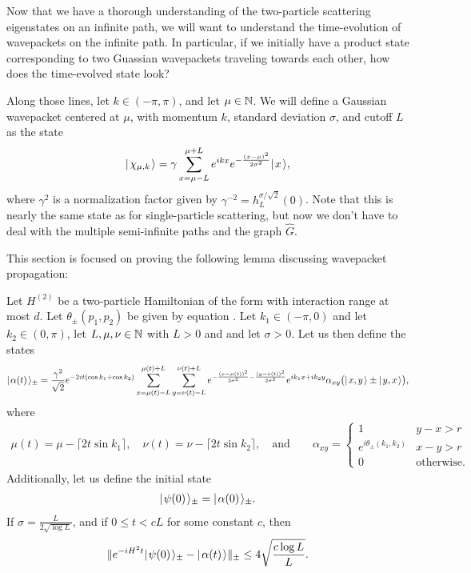 \documentclass[../thesis-main/thesis-main]{subfiles}
\begin{document}
Now that we have a thorough understanding of the two-particle scattering eigenstates on an infinite path, we will want to understand the time-evolution of wavepackets on the infinite path.  In particular, if we initially have a product state corresponding to two Guassian wavepackets traveling towards each other, how does the time-evolved state look?

Along those lines, let $k\in(-\pi,\pi)$, and let $\mu \in \mathbb{N}$.  We will define a Gaussian wavepacket centered at $\mu$, with momentum $k$, standard deviation $\sigma$, and cutoff $L$ as the state
\begin{align}
  |\mspace{2mu} \chi_{\mu,k} \mspace{2mu} \rangle = \gamma \sum_{x=\mu-L}^{\mu+L} e^{i k x} e^{ -\frac{(x-\mu)^2}{2\sigma^2}} |\mspace{2mu} x \mspace{2mu} \rangle,
\end{align}
where $\gamma^2$ is a normalization factor given by $\gamma^{-2} = h_L^{\sigma/\sqrt{2}}(0)$.  Note that this is nearly the same state as for single-particle scattering, but now we don't have to deal with the multiple semi-infinite paths and the graph $\widehat{G}$.

This section is focused on proving the following lemma discussing wavepacket propagation:
\begin{theorem}
Let $H^{(2)}$ be a two-particle Hamiltonian of the form  with interaction range at most $d$.  Let $\theta_{\pm}(p_1,p_2)$ be given by equation .  Let $k_1\in (-\pi,0)$ and let $k_2 \in (0,\pi)$, let $L,\mu, \nu \in \mathbb{N}$ with $L>0$ and and let $\sigma > 0$.  Let us then define the states
\begin{align}
  |\mspace{2mu} \alpha(t) \mspace{2mu} \rangle_{\pm} = \frac{\gamma^2}{\sqrt{2}} e^{-2i t (\cos k_1 + \cos k_2)} \sum_{x = \mu(t)-L}^{\mu(t)+L} \sum_{y = \nu(t) -L}^{\nu(t)+L} e^{ -\frac{ (x-\mu(t))^2}{2\sigma^2} - \frac{(y-\nu(t))^2}{2\sigma^2}} e^{i k_1 x + i k_2 y} \alpha_{xy} \big( |\mspace{2mu} x,y \mspace{2mu} \rangle \pm |\mspace{2mu} y,x \mspace{2mu} \rangle\big),
\end{align}
where
\begin{align}
  \mu(t) = \mu - \lceil 2 t \sin k_1\rceil, \quad
  \nu(t) = \nu - \lceil 2 t \sin k_2\rceil, \quad \text{and} \qquad
  \alpha_{xy} = \begin{cases} 1  & y-x > r\\
  e^{i\theta_\pm(k_1,k_2)} & x-y > r\\
  0 & \text{otherwise}.
  \end{cases}
\end{align}
Additionally, let us define the initial state
\begin{align}
  |\mspace{2mu} \psi(0) \mspace{2mu} \rangle_{\pm} = |\mspace{2mu} \alpha(0) \mspace{2mu} \rangle_{\pm}.
\end{align}
If $\sigma = \frac{ L}{2\sqrt{\log L}}$, and if $0 \leq t < c L$ for some constant $c$, then 
\begin{align}
  \|{e^{ - i H^2 t} |\mspace{2mu} \psi(0) \mspace{2mu} \rangle_{\pm} - |\mspace{2mu} \alpha(t) \mspace{2mu} \rangle}\|_{\pm} \leq 4 \sqrt{\frac{c\log L}{L}}.
\end{align}
\label{thm:two_particle_wavepacket_bound}
\end{theorem}
\end{document}
